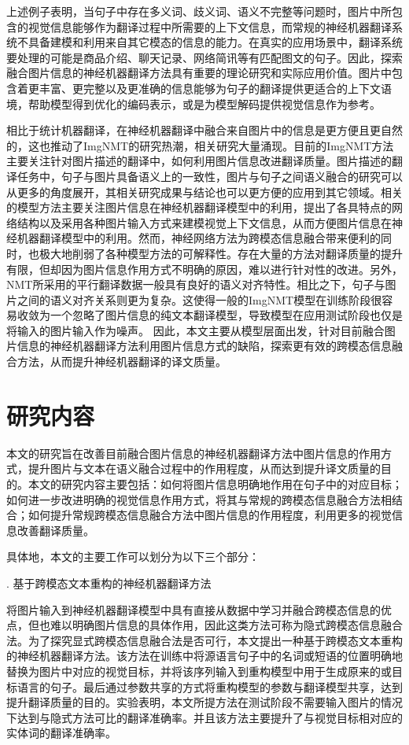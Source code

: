 上述例子表明，当句子中存在多义词、歧义词、语义不完整等问题时，图片中所包含的视觉信息能够作为翻译过程中所需要的上下文信息，而常规的神经机器翻译系统不具备建模和利用来自其它模态的信息的能力。在真实的应用场景中，翻译系统要处理的可能是商品介绍、聊天记录、网络简讯等有匹配图文的句子。因此，探索融合图片信息的神经机器翻译方法具有重要的理论研究和实际应用价值。图片中包含着更丰富、更完整以及更准确的信息能够为句子的翻译提供更适合的上下文语境，帮助模型得到优化的编码表示，或是为模型解码提供视觉信息作为参考。

相比于统计机器翻译，在神经机器翻译中融合来自图片中的信息是更方便且更自然的，这也推动了ImgNMT的研究热潮，相关研究大量涌现。目前的ImgNMT方法主要关注针对图片描述的翻译中，如何利用图片信息改进翻译质量。图片描述的翻译任务中，句子与图片具备语义上的一致性，图片与句子之间语义融合的研究可以从更多的角度展开，其相关研究成果与结论也可以更方便的应用到其它领域。相关的模型方法主要关注图片信息在神经机器翻译模型中的利用，提出了各具特点的网络结构以及采用各种图片输入方式来建模视觉上下文信息，从而方便图片信息在神经机器翻译模型中的利用。然而，神经网络方法为跨模态信息融合带来便利的同时，也极大地削弱了各种模型方法的可解释性。存在大量的方法对翻译质量的提升有限，但却因为图片信息作用方式不明确的原因，难以进行针对性的改进。另外，NMT所采用的平行翻译数据一般具有良好的语义对齐特性。相比之下，句子与图片之间的语义对齐关系则更为复杂。这使得一般的ImgNMT模型在训练阶段很容易收敛为一个忽略了图片信息的纯文本翻译模型，导致模型在应用测试阶段也仅是将输入的图片输入作为噪声。
因此，本文主要从模型层面出发，针对目前融合图片信息的神经机器翻译方法利用图片信息方式的缺陷，探索更有效的跨模态信息融合方法，从而提升神经机器翻译的译文质量。


\section{研究内容}

本文的研究旨在改善目前融合图片信息的神经机器翻译方法中图片信息的作用方式，提升图片与文本在语义融合过程中的作用程度，从而达到提升译文质量的目的。本文的研究内容主要包括：如何将图片信息明确地作用在句子中的对应目标；如何进一步改进明确的视觉信息作用方式，将其与常规的跨模态信息融合方法相结合；如何提升常规跨模态信息融合方法中图片信息的作用程度，利用更多的视觉信息改善翻译质量。

具体地，本文的主要工作可以划分为以下三个部分：


{. 基于跨模态文本重构的神经机器翻译方法}

将图片输入到神经机器翻译模型中具有直接从数据中学习并融合跨模态信息的优点，但也难以明确图片信息的具体作用，因此这类方法可称为隐式跨模态信息融合法。为了探究显式跨模态信息融合法是否可行，本文提出一种基于跨模态文本重构的神经机器翻译方法。该方法在训练中将源语言句子中的名词或短语的位置明确地替换为图片中对应的视觉目标，并将该序列输入到重构模型中用于生成原来的或目标语言的句子。最后通过参数共享的方式将重构模型的参数与翻译模型共享，达到提升翻译质量的目的。实验表明，本文所提方法在测试阶段不需要输入图片的情况下达到与隐式方法可比的翻译准确率。并且该方法主要提升了与视觉目标相对应的实体词的翻译准确率。


